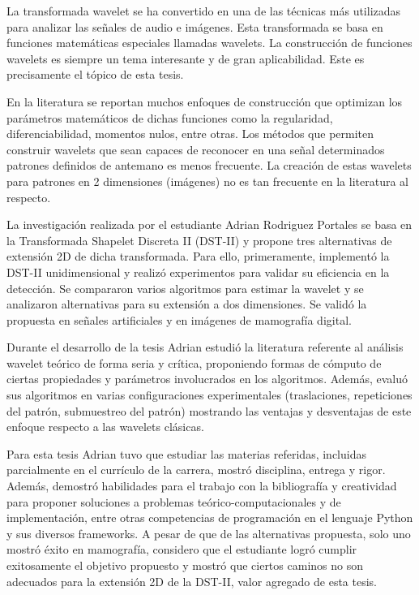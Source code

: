 \begin{opinion}
	La transformada wavelet se ha convertido en una de las técnicas más utilizadas para analizar las señales de audio e imágenes. Esta transformada se basa en funciones matemáticas especiales llamadas wavelets. La construcción de funciones wavelets es siempre un tema interesante y de gran aplicabilidad. Este es precisamente el tópico de esta tesis.

	En la literatura se reportan muchos enfoques de construcción que optimizan los parámetros matemáticos de dichas funciones como la regularidad, diferenciabilidad, momentos nulos, entre otras. Los métodos que permiten construir wavelets que sean capaces de reconocer en una señal determinados patrones definidos de antemano es menos frecuente. La creación de estas wavelets para patrones en 2 dimensiones (imágenes) no es tan frecuente en la literatura al respecto.

	La investigación realizada por el estudiante Adrian Rodriguez Portales se basa en la Transformada Shapelet Discreta II (DST-II) y propone tres alternativas de extensión 2D de dicha transformada. Para ello, primeramente, implementó la DST-II unidimensional y realizó experimentos para validar su eficiencia en la detección. Se compararon varios algoritmos para estimar la wavelet y se analizaron alternativas para su extensión a dos dimensiones. Se validó la propuesta en señales artificiales y en imágenes de mamografía digital. 

	Durante el desarrollo de la tesis Adrian estudió la literatura referente al análisis wavelet teórico de forma seria y crítica, proponiendo formas de cómputo de ciertas propiedades y parámetros involucrados en los algoritmos. Además, evaluó sus algoritmos en varias configuraciones experimentales (traslaciones, repeticiones del patrón, submuestreo del patrón) mostrando las ventajas y desventajas de este enfoque respecto a las wavelets clásicas. 

	Para esta tesis Adrian tuvo que estudiar las materias referidas, incluidas parcialmente en el currículo de la carrera, mostró disciplina, entrega y rigor. Además, demostró habilidades para el trabajo con la bibliografía y creatividad para proponer soluciones a problemas teórico-computacionales y de implementación, entre otras competencias de programación en el lenguaje Python y sus diversos frameworks. A pesar de que de las alternativas propuesta, solo uno mostró éxito en mamografía, considero que el estudiante logró cumplir exitosamente el objetivo propuesto y mostró que ciertos caminos no son adecuados para la extensión 2D de la DST-II, valor agregado de esta tesis.


\end{opinion}

